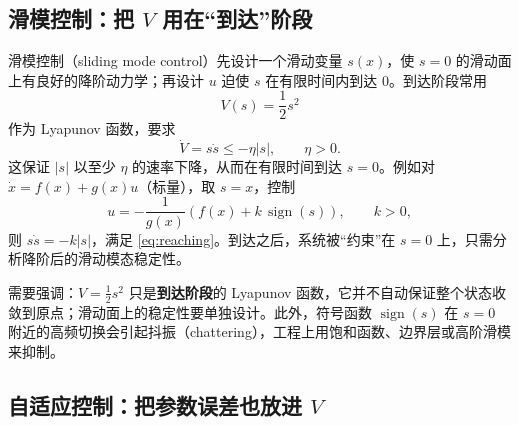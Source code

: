 \documentclass[11pt, a4paper, UTF8, fontset=none]{ctexart}
\theoremstyle{cnthm}
\newcommand{\abs}[1]{\lvert #1\rvert}
\begin{document}
\subsection{滑模控制：把 \texorpdfstring{$V$}{V} 用在“到达”阶段}

滑模控制（sliding mode control）先设计一个滑动变量 $s(x)$，使 $s=0$ 的滑动面上有良好的降阶动力学；再设计 $u$ 迫使 $s$ 在有限时间内到达 $0$。到达阶段常用
\begin{equation}
  V(s)=\frac12s^2
\end{equation}
作为 Lyapunov 函数，要求
\begin{equation}
  \dot V=s\dot s\le-\eta\abs{s},\qquad \eta>0.
  \label{eq:reaching}
\end{equation}
这保证 $\abs{s}$ 以至少 $\eta$ 的速率下降，从而在有限时间到达 $s=0$。例如对 $\dot x=f(x)+g(x)u$（标量），取 $s=x$，控制
\begin{equation}
  u=-\frac{1}{g(x)}\left(f(x)+k\,\operatorname{sign}(s)\right),\qquad k>0,
\end{equation}
则 $s\dot s=-k\abs{s}$，满足 \eqref{eq:reaching}。到达之后，系统被“约束”在 $s=0$ 上，只需分析降阶后的滑动模态稳定性。

需要强调：$V=\frac12s^2$ 只是\textbf{到达阶段}的 Lyapunov 函数，它并不自动保证整个状态收敛到原点；滑动面上的稳定性要单独设计。此外，符号函数 $\operatorname{sign}(s)$ 在 $s=0$ 附近的高频切换会引起抖振（chattering），工程上用饱和函数、边界层或高阶滑模来抑制。

\subsection{自适应控制：把参数误差也放进 \texorpdfstring{$V$}{V}}
\end{document}
